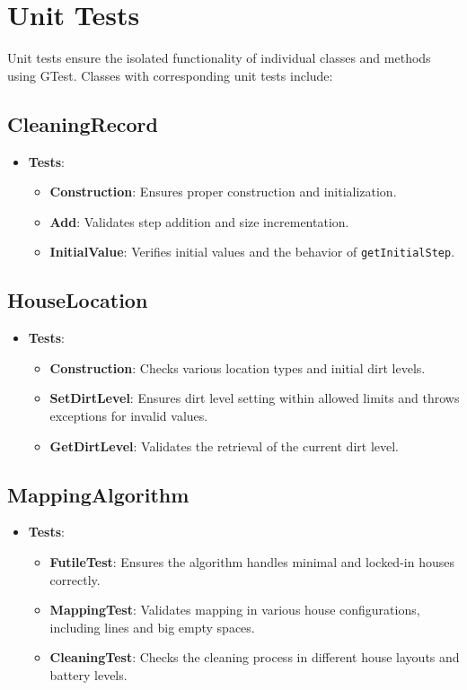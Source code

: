 \documentclass{article}
\begin{document}
\section{Unit Tests}
Unit tests ensure the isolated functionality of individual classes and methods using GTest. Classes with corresponding unit tests include:

\subsection{CleaningRecord}
\begin{itemize}
    \item \textbf{Tests}:
    \begin{itemize}
        \item \textbf{Construction}: Ensures proper construction and initialization.
        \item \textbf{Add}: Validates step addition and size incrementation.
        \item \textbf{InitialValue}: Verifies initial values and the behavior of \texttt{getInitialStep}.
    \end{itemize}
\end{itemize}

\subsection{HouseLocation}
\begin{itemize}
    \item \textbf{Tests}:
    \begin{itemize}
        \item \textbf{Construction}: Checks various location types and initial dirt levels.
        \item \textbf{SetDirtLevel}: Ensures dirt level setting within allowed limits and throws exceptions for invalid values.
        \item \textbf{GetDirtLevel}: Validates the retrieval of the current dirt level.
    \end{itemize}
\end{itemize}

\subsection{MappingAlgorithm}
\begin{itemize}
    \item \textbf{Tests}:
    \begin{itemize}
        \item \textbf{FutileTest}: Ensures the algorithm handles minimal and locked-in houses correctly.
        \item \textbf{MappingTest}: Validates mapping in various house configurations, including lines and big empty spaces.
        \item \textbf{CleaningTest}: Checks the cleaning process in different house layouts and battery levels.
    \end{itemize}
\end{itemize}
\end{document}
